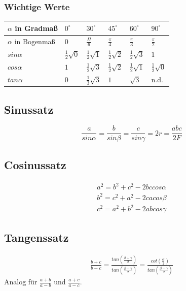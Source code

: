 \documentclass[12pt,a4paper]{report}%
\numberwithin{equation}{section}
\numberwithin{equation}{subsection}
\begin{document}
	  \subsubsection{Wichtige Werte}
	  \renewcommand{\arraystretch}{1.5}
	  \begin{tabular}{|p{3.2cm}|p{1.8cm}|p{1.8cm}|p{1.8cm}|p{1.8cm}|p{1.8cm}|}\hline
	  $\alpha$ in Gradmaß & $0^{\circ}$ & $30^{\circ}$ & $45^{\circ}$ & $60^{\circ}$ & $90^{\circ}$ \\ \hline
	  $\alpha$ in Bogenmaß & $0$ & $\frac{\Pi}{6}$ & $\frac{\pi}{4}$ & $\frac{\pi}{3}$ & $\frac{\pi}{2}$ \\ \hline
	  $sin\alpha$ & $\frac{1}{2}\sqrt{0}$ & $\frac{1}{2}\sqrt{1}$ & $\frac{1}{2} \sqrt{2}$ & $\frac{1}{2}\sqrt{3}$ & $1$ \\ \hline
	  $cos\alpha$ & $1$ & $\frac{1}{2}\sqrt{3}$ & $\frac{1}{2}\sqrt{2}$ & $\frac{1}{2}\sqrt{1}$ & $\frac{1}{2}\sqrt{0}$ \\ \hline
	  $tan\alpha$ & $0$ & $\frac{1}{3}\sqrt{3}$ & $1$ & $\sqrt{3}$ & n.d. \\ \hline
	  \end{tabular}
	  \renewcommand{\arraystretch}{1}
	  
	  \subsection{Sinussatz}
	  \begin{equation}
	    \frac{a}{sin\alpha} = \frac{b}{sin\beta} = \frac{c}{sin\gamma} = 2r = \frac{abc}{2F} \label{eq:allg_sinussatz}  
	  \end{equation}
	  
	  \subsection{Cosinussatz}
	  \begin{align}   
	    a^2 = b^2 + c^2 - 2bc cos\alpha\\
	    b^2 = c^2 + a^2 - 2ca cos\beta\\
	    c^2 = a^2 + b^2 - 2ab cos\gamma \label{eq:trigo_cosinussatz}
	  \end{align}
	  
	  \subsection{Tangenssatz}
	  \begin{align}
	    \frac{b + c}{b - c} = \frac{tan\left(\frac{\beta + \gamma}{2}\right)}{tan\left(\frac{\beta - \gamma}{2}\right)} 
	    = \frac{cot\left(\frac{\alpha}{2} \right)}{tan\left(\frac{\beta - \gamma}{2}\right)}
	  \end{align}
	  Analog für $\frac{a + b}{a - b}$ und $\frac{a + c}{a - c}$.\label{eq:trigo_tangenssatz}
	  
\end{document}
